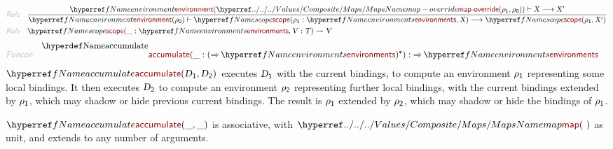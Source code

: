 \begin{align*}
  \KEY{Rule} \quad
    & \frac{
      \NAMEREF{environment} (  \NAMEHYPER{../../../Values/Composite}{Maps}{map-override}
                                   (  \VAR{\ensuremath{\rho}}\SUB{1}, 
                                          \VAR{\ensuremath{\rho}}\SUB{0} ) ) \vdash \VAR{X} \TRANS 
        \VAR{X}'
      }{
      \NAMEREF{environment} (  \VAR{\ensuremath{\rho}}\SUB{0} ) \vdash \NAMEREF{scope}
                    (  \VAR{\ensuremath{\rho}}\SUB{1} : \NAMEREF{environments}, 
                           \VAR{X} ) \TRANS 
        \NAMEREF{scope}
          (  \VAR{\ensuremath{\rho}}\SUB{1}, 
                 \VAR{X}' )
      }
\\
  \KEY{Rule} \quad
    & \NAMEREF{scope}
        (  \_ : \NAMEREF{environments}, 
               \VAR{V} : \VAR{T} ) \leadsto 
        \VAR{V}
\end{align*}
\begin{align*}
  \KEY{Funcon} \quad
  & \NAMEDECL{accumulate}(
                       \_ : (   \TO \NAMEREF{environments} )\STAR) 
    :  \TO \NAMEREF{environments} 
\end{align*}
$\NAMEREF{accumulate}
    (  \VAR{D}\SUB{1}, 
           \VAR{D}\SUB{2} )$ executes $\VAR{D}\SUB{1}$ with the current bindings, to compute an
  environment $\VAR{\ensuremath{\rho}}\SUB{1}$ representing some local bindings. It then executes $\VAR{D}\SUB{2}$ to
  compute an environment $\VAR{\ensuremath{\rho}}\SUB{2}$ representing further local bindings, with the
  current bindings extended by $\VAR{\ensuremath{\rho}}\SUB{1}$, which may shadow or hide previous
  current bindings. The result is $\VAR{\ensuremath{\rho}}\SUB{1}$ extended by $\VAR{\ensuremath{\rho}}\SUB{2}$, which may shadow
  or hide the bindings of $\VAR{\ensuremath{\rho}}\SUB{1}$.

$\NAMEREF{accumulate}
    (  \_, 
           \_ )$ is associative, with $\NAMEHYPER{../../../Values/Composite}{Maps}{map}
    (   \  )$ as unit, and extends to any
  number of arguments.

